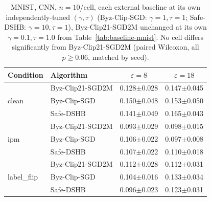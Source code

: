 \documentclass{article}
\begin{document}
\begin{table}[t]
\centering\small
\begin{tabular}{llcc}
\toprule
Condition & Algorithm & $\varepsilon{=}8$ & $\varepsilon{=}18$ \\
\midrule
\multirow{3}{*}{clean}
 & Byz-Clip21-SGD2M & 0.128$\pm$0.028 & 0.147$\pm$0.045 \\
 & Byz-Clip-SGD     & 0.150$\pm$0.048 & 0.153$\pm$0.050 \\
 & Safe-DSHB        & 0.141$\pm$0.049 & 0.165$\pm$0.043 \\
\multirow{3}{*}{ipm}
 & Byz-Clip21-SGD2M & 0.093$\pm$0.029 & 0.098$\pm$0.015 \\
 & Byz-Clip-SGD     & 0.106$\pm$0.022 & 0.097$\pm$0.008 \\
 & Safe-DSHB        & 0.107$\pm$0.022 & 0.110$\pm$0.018 \\
\multirow{3}{*}{label\_flip}
 & Byz-Clip21-SGD2M & 0.112$\pm$0.028 & 0.112$\pm$0.031 \\
 & Byz-Clip-SGD     & 0.104$\pm$0.016 & 0.133$\pm$0.034 \\
 & Safe-DSHB        & 0.096$\pm$0.023 & 0.123$\pm$0.031 \\
\bottomrule
\end{tabular}
\caption{MNIST, CNN, $n{=}10$/cell, each external baseline at its own
independently-tuned $(\gamma,\tau)$ (Byz-Clip-SGD: $\gamma{=}1,\tau{=}1$;
Safe-DSHB: $\gamma{=}10,\tau{=}1$), Byz-Clip21-SGD2M unchanged at its own
$\gamma{=}0.1,\tau{=}1.0$ from Table~\ref{tab:baseline-mnist}. No cell differs
significantly from Byz-Clip21-SGD2M (paired Wilcoxon, all $p\geq0.06$,
matched by seed).}
\label{tab:baseline-mnist-tuned}
\end{table}
\end{document}

